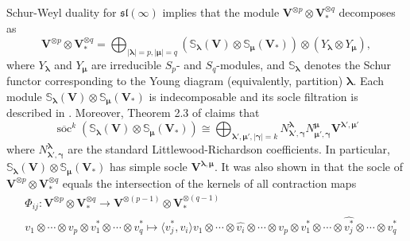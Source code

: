\documentclass[12pt,oneside,english]{amsart}
\numberwithin{equation}{section}
\numberwithin{figure}{section}
\theoremstyle{plain}
\theoremstyle{plain}
\theoremstyle{remark}
\theoremstyle{definition}
\theoremstyle{plain}
\theoremstyle{remark}
\theoremstyle{definition}
\theoremstyle{plain}
\theoremstyle{plain}
\theoremstyle{definition}
\newcommand{\bV}{\mathbf{V}}
\newcommand{\soc}{\operatorname{soc}}
\begin{document}
Schur-Weyl duality for $\mathfrak{sl}(\infty)$ implies that the module $\bV^{\otimes p}\otimes \bV_{*}^{\otimes q}$ decomposes as
\begin{equation}\label{summands}
\bV^{\otimes p}\otimes \bV_{*}^{\otimes q}=\bigoplus_{|\boldsymbol{\lambda}|=p,|{\boldsymbol{\mu}}|=q}
(\mathbb{S}_{\boldsymbol{\lambda}}(\bV)\otimes \mathbb{S}_{\boldsymbol{{\boldsymbol{\mu}}}}(\bV_*))\otimes (Y_{\boldsymbol{\lambda}}\otimes Y_{{\boldsymbol{\mu}}}),
\end{equation}
where $Y_{\boldsymbol{\lambda}}$ and $Y_{\boldsymbol{\mu}}$ are irreducible $S_p$- and $S_q$-modules, and $\mathbb{S}_{\boldsymbol{{\boldsymbol{\lambda}}}}$ denotes the Schur functor corresponding to the Young diagram (equivalently, partition) $\boldsymbol{\boldsymbol{\lambda}}$.
Each module  $\mathbb{S}_{\boldsymbol{\lambda}}(\bV)\otimes \mathbb{S}_{{\boldsymbol{\mu}}}(\bV_*)$ is indecomposable and its socle filtration is described in \cite{PStyr}. Moreover, Theorem 2.3 of \cite{PStyr} claims that
\begin{equation}\label{socle of S}
\overline{\soc}^k(\mathbb{S}_{\boldsymbol{\lambda}}(\bV)\otimes \mathbb{S}_{{\boldsymbol{\mu}}}(\bV_*))\cong\bigoplus_{\boldsymbol{\lambda'},\boldsymbol{\mu'}, |{\boldsymbol{\gamma}}|=k} N^{\boldsymbol{\lambda}}_{\boldsymbol{\lambda}',{\boldsymbol{\gamma}}}N^{\boldsymbol{\mu}}_{{\boldsymbol{\mu}}',{\boldsymbol{\gamma}}}\bV^{\boldsymbol{\boldsymbol{\lambda}}',{\boldsymbol{\mu}}'}
\end{equation}
where
$N^{\boldsymbol{\lambda}}_{\boldsymbol{\lambda}',{\boldsymbol{\gamma}}}$ are the standard Littlewood-Richardson coefficients. In particular,  $\mathbb{S}_{\boldsymbol{\lambda}}(\bV)\otimes \mathbb{S}_{{\boldsymbol{\mu}}}(\bV_*)$ has simple socle $\bV^{\boldsymbol{\lambda},\boldsymbol{\mu}}$.
It was also shown in  \cite[Theorem 2.2]{PStyr} that the socle of  $\bV^{\otimes p}\otimes \bV_{*}^{\otimes q}$ equals the intersection of the kernels of all contraction maps
\begin{eqnarray}\label{contractions}
&\Phi_{ij}:\bV^{\otimes p}\otimes \bV_{*}^{\otimes q}\rightarrow\bV^{\otimes (p-1)}\otimes \bV_{*}^{\otimes (q-1)} \\
&\nonumber v_1\otimes\cdots\otimes v_p\otimes v_1^*\otimes\cdots\otimes v_q^* \mapsto \langle v^*_j , v_i \rangle v_1\otimes\cdots\otimes \widehat{v_i} \otimes\cdots\otimes v_p\otimes v_1^*\otimes\cdots\otimes \widehat{v_j^*} \otimes\cdots\otimes v_q^*
\end{eqnarray}
\end{document}
